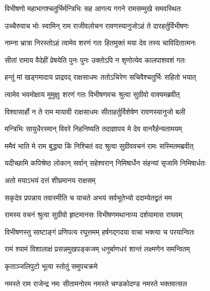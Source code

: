 




\twolineshloka
{विभीषणो महाभागश्चतुर्भिर्मन्त्रिभिः सह}
{आगत्य गगने रामसम्मुखे समवस्थितः} %

\twolineshloka
{उच्चैरुवाच भोः स्वामिन् राम राजीवलोचन}
{रावणस्यानुजोऽहं ते दारहर्तुर्विभीषणः} %

\twolineshloka
{नाम्ना भ्रात्रा निरस्तोऽहं त्वामेव शरणं गतः}
{हितमुक्तं मया देव तस्य चाविदितात्मनः} %

\twolineshloka
{सीतां रामाय वैदेहीं प्रेषयेति पुनः पुनः}
{उक्तोऽपि न शृणोत्येव कालपाशवशं गतः} %

\twolineshloka
{हन्तुं मां खड्गमादाय प्राद्रवद् राक्षसाधमः}
{ततोऽचिरेण सचिवैश्चतुर्भिः सहितो भयात्} %

\twolineshloka
{त्वामेव भवमोक्षाय मुमुक्षुः शरणं गतः}
{विभीषणवचः श्रुत्वा सुग्रीवो वाक्यमब्रवीत्} %

\twolineshloka
{विश्वासार्हो न ते राम मायावी राक्षसाधमः}
{सीताहर्तुर्विशेषेण रावणस्यानुजो बली} %

\twolineshloka
{मन्त्रिभिः सायुधैरस्मान् विवरे निहनिष्यति}
{तदाज्ञापय मे देव वानरैर्हन्यतामयम्} %

\twolineshloka
{ममैवं भाति मे राम बुद्ध्या किं निश्चितं वद}
{श्रुत्वा सुग्रीववचनं रामः सस्मितमब्रवीत्} %

\twolineshloka
{यदीच्छामि कपिश्रेष्ठ लोकान् सर्वान् सहेश्वरान्}
{निमिषार्धेन संहन्यां सृजामि निमिषार्धतः} %

\onelineshloka
{अतो मयाऽभयं दत्तं शीघ्रमानय राक्षसम्} %

\twolineshloka
{सकृदेव प्रपन्नाय तवास्मीति च याचते}
{अभयं सर्वभूतेभ्यो ददाम्येतद्व्रतं मम} %

\twolineshloka
{रामस्य वचनं श्रुत्वा सुग्रीवो हृष्टमानसः}
{विभीषणमथानाय्य दर्शयामास राघवम्} %

\twolineshloka
{विभीषणस्तु साष्टाङ्गं प्रणिपत्य रघूत्तमम्}
{हर्षगद्गदया वाचा भक्त्या च परयान्वितः} %

\twolineshloka
{रामं श्यामं विशालाक्षं प्रसन्नमुखपङ्कजम्}
{धनुर्बाणधरं शान्तं लक्ष्मणेन समन्वितम्} %

\onelineshloka
{कृताञ्जलिपुटो भूत्वा स्तोतुं समुपचक्रमे} %



\twolineshloka
{नमस्ते राम राजेन्द्र नमः सीतामनोरम}
{नमस्ते चण्डकोदण्ड नमस्ते भक्तवत्सल} %

